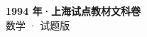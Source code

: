 \documentclass[zihao=-4, a4paper]{ctexart}
\begin{document}
\begin{center}
  {\Large\bfseries 1994 年·上海试点教材文科卷}\\[4pt]
  {\large 数学 · 试题版}
\end{center}
\medskip
{}

\end{document}

